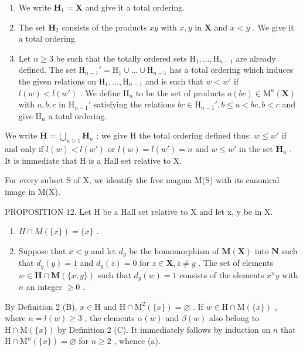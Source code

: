 \begin{enumerate}
\def\labelenumi{(\alph{enumi})}
\item
  We write \(\mathbf{H}_1 = \mathbf{X}\) and give it a total ordering.
\item
  The set \(\mathbf{H}_2\) consists of the products \(xy\) with \(x, y\) in \(\mathbf{X}\) and \(x < y\) . We give it a total ordering.
\item
  Let \(n \geqslant 3\) be such that the totally ordered sets \(\mathrm{H}_1, \ldots, \mathrm{H}_{n-1}\) are already defined. The set \(\mathrm{H}_{n-1}' = \mathrm{H}_1 \cup \dots \cup \mathrm{H}_{n-1}\) has a total ordering which induces the given relations on \(\mathrm{H}_1, \ldots, \mathrm{H}_{n-1}\) and is such that \(w < w'\) if \(l(w) < l(w')\) . We define \(\mathrm{H}_n\) to be the set of products \(a(bc) \in \mathrm{M}^n(\mathbf{X})\) with \(a, b, c\) in \(\mathrm{H}_{n-1}'\) satisfying the relations \(bc \in \mathrm{H}_{n-1}', b \leqslant a < bc, b < c\) and give \(\mathrm{H}_n\) a total ordering.
\end{enumerate}

We write \(\mathbf{H} = \bigcup_{n\geqslant 1}\mathbf{H}_n\) ; we give H the total ordering defined thus: \(w\leqslant w'\) if and only if \(l(w) < l(w')\) or \(l(w) = l(w') = n\) and \(w\leqslant w'\) in the set \(\mathbf{H}_n\) . It is immediate that H is a Hall set relative to X.

For every subset S of X, we identify the free magma M(S) with its canonical image in M(X).

PROPOSITION 12. Let H be a Hall set relative to X and let x, y be in X.

\begin{enumerate}
\def\labelenumi{(\alph{enumi})}
\item
  \(H \cap M(\{x\}) = \{x\}\) .
\item
  Suppose that \(x < y\) and let \(d_y\) be the homomorphism of \(\mathbf{M}(\mathbf{X})\) into \(\mathbf{N}\) such that \(d_y(y) = 1\) and \(d_y(z) = 0\) for \(z \in \mathbf{X}, z \neq y\) . The set of elements \(w \in \mathbf{H} \cap \mathbf{M}(\{x, y\})\) such that \(d_y(w) = 1\) consists of the elements \(x^n y\) with \(n\) an integer \(\geqslant 0\) .
\end{enumerate}

By Definition 2 (B), \(x \in \mathrm{H}\) and \(\mathrm{H} \cap \mathrm{M}^2(\{x\}) = \varnothing\) . If \(w \in \mathrm{H} \cap \mathrm{M}(\{x\})\) , where \(n = l(w) \geqslant 3\) , the elements \(\alpha(w)\) and \(\beta(w)\) also belong to \(\mathrm{H} \cap \mathrm{M}(\{x\})\) by Definition 2 (C). It immediately follows by induction on \(n\) that \(\mathrm{H} \cap \mathrm{M}^n(\{x\}) = \varnothing\) for \(n \geqslant 2\) , whence (a).

